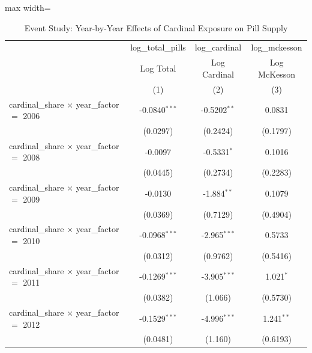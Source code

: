 
\begin{table}[htbp]
   \caption{\label{tab:event_study} Event Study: Year-by-Year Effects of Cardinal Exposure on Pill Supply}
   \bigskip
   \centering
   \begin{adjustbox}{max width=\textwidth}
   \begin{tabular}{lccc}
      \toprule
                                                        & log\_total\_pills   & log\_cardinal  & log\_mckesson\\   
                                                        & Log Total           & Log Cardinal   & Log McKesson \\   
                                                        & (1)                 & (2)            & (3)\\  
      \midrule 
      cardinal\_share $\times$ year\_factor $=$ 2006    & -0.0840$^{***}$     & -0.5202$^{**}$ & 0.0831\\   
                                                        & (0.0297)            & (0.2424)       & (0.1797)\\   
      cardinal\_share $\times$ year\_factor $=$ 2008    & -0.0097             & -0.5331$^{*}$  & 0.1016\\   
                                                        & (0.0445)            & (0.2734)       & (0.2283)\\   
      cardinal\_share $\times$ year\_factor $=$ 2009    & -0.0130             & -1.884$^{**}$  & 0.1079\\   
                                                        & (0.0369)            & (0.7129)       & (0.4904)\\   
      cardinal\_share $\times$ year\_factor $=$ 2010    & -0.0968$^{***}$     & -2.965$^{***}$ & 0.5733\\   
                                                        & (0.0312)            & (0.9762)       & (0.5416)\\   
      cardinal\_share $\times$ year\_factor $=$ 2011    & -0.1269$^{***}$     & -3.905$^{***}$ & 1.021$^{*}$\\   
                                                        & (0.0382)            & (1.066)        & (0.5730)\\   
      cardinal\_share $\times$ year\_factor $=$ 2012    & -0.1529$^{***}$     & -4.996$^{***}$ & 1.241$^{**}$\\   
                                                        & (0.0481)            & (1.160)        & (0.6193)\\   

\end{tabular}
\end{adjustbox}
\end{table}
